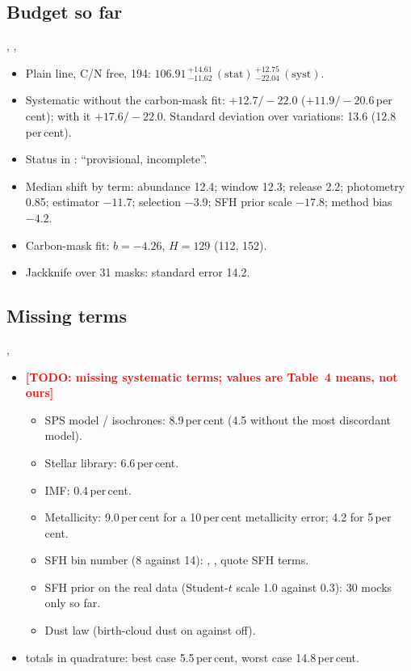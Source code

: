 \documentclass[fleqn,usenatbib]{mnras}
\newcommand{\todo}[1]{\textcolor{red}{\textbf{[TODO: #1]}}}
\begin{document}
\subsection{Budget so far}
, , 
\begin{itemize}
\item Plain line, C/N free, 194: $106.91\,^{+14.61}_{-11.62}\,(\mathrm{stat})\,^{+12.75}_{-22.04}\,(\mathrm{syst})$.
\item Systematic without the carbon-mask fit: $+12.7/-22.0$ ($+11.9/-20.6$\,per\,cent); with it $+17.6/-22.0$. Standard deviation over variations: 13.6 (12.8\,per\,cent).
\item Status in : ``provisional, incomplete''.
\item Median shift by term: abundance 12.4; window 12.3; release 2.2; photometry 0.85; estimator $-11.7$; selection $-3.9$; SFH prior scale $-17.8$; method bias $-4.2$.
\item Carbon-mask fit: $b=-4.26$, $H=129$ (112, 152). 
\item Jackknife over 31 masks: standard error 14.2. 
\end{itemize}

\subsection{Missing terms}
, 
\begin{itemize}
\item \todo{missing systematic terms; values are \citet{Moresco2020} Table~4 means, not ours}
  \begin{itemize}
  \item SPS model / isochrones: 8.9\,per\,cent (4.5 without the most discordant model).
  \item Stellar library: 6.6\,per\,cent.
  \item IMF: 0.4\,per\,cent.
  \item Metallicity: 9.0\,per\,cent for a 10\,per\,cent metallicity error; 4.2 for 5\,per\,cent.
  \item SFH bin number (8 against 14): \citet{Borghi2022b}, \citet{Jiao2023}, \citet{Tomasetti2023} quote SFH terms.
  \item SFH prior on the real data (Student-$t$ scale 1.0 against 0.3): 30 mocks only so far.
  \item Dust law (birth-cloud dust on against off).
  \end{itemize}
\item \citet{Moresco2020} totals in quadrature: best case 5.5\,per\,cent, worst case 14.8\,per\,cent.
\end{itemize}
\end{document}
